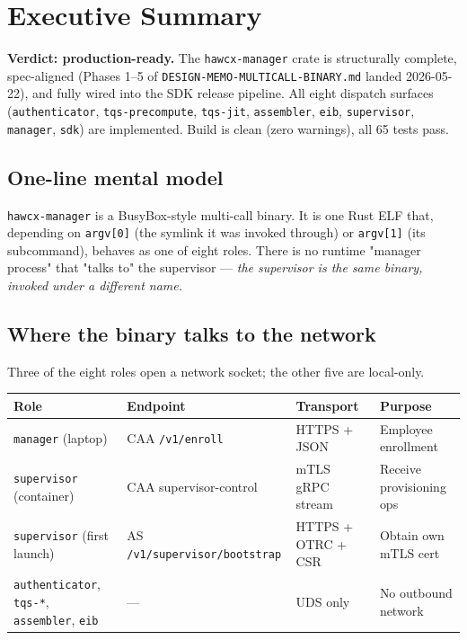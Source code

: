 \documentclass[11pt, a4paper]{article}
\newcommand{\code}[1]{\texttt{\small #1}}
\begin{document}
\section{Executive Summary}

\begin{okbox}
\textbf{Verdict: production-ready.} The \code{hawcx-manager} crate is structurally
complete, spec-aligned (Phases 1--5 of \code{DESIGN-MEMO-MULTICALL-BINARY.md}
landed 2026-05-22), and fully wired into the SDK release pipeline. All eight
dispatch surfaces (\code{authenticator}, \code{tqs-precompute}, \code{tqs-jit},
\code{assembler}, \code{eib}, \code{supervisor}, \code{manager}, \code{sdk})
are implemented. Build is clean (zero warnings), all 65 tests pass.
\end{okbox}

\subsection*{One-line mental model}

\code{hawcx-manager} is a BusyBox-style multi-call binary. It is one Rust ELF
that, depending on \code{argv[0]} (the symlink it was invoked through) or
\code{argv[1]} (its subcommand), behaves as one of eight roles. There is no
runtime "manager process" that "talks to" the supervisor --- \emph{the
supervisor is the same binary, invoked under a different name.}

\subsection*{Where the binary talks to the network}

Three of the eight roles open a network socket; the other five are local-only.

\begin{center}
\renewcommand{\arraystretch}{1.25}
\begin{tabularx}{\textwidth}{L{3.7cm} L{4.4cm} L{3.2cm} X}
\toprule
\textbf{Role} & \textbf{Endpoint} & \textbf{Transport} & \textbf{Purpose}\\
\midrule
\code{manager} (laptop) & CAA \code{/v1/enroll} & HTTPS + JSON & Employee enrollment\\
\code{supervisor} (container) & CAA supervisor-control & mTLS gRPC stream & Receive provisioning ops\\
\code{supervisor} (first launch) & AS \code{/v1/supervisor/bootstrap} & HTTPS + OTRC + CSR & Obtain own mTLS cert\\
\code{authenticator}, \code{tqs-*}, \code{assembler}, \code{eib} & --- & UDS only & No outbound network\\
\bottomrule
\end{tabularx}
\end{center}
\end{document}
